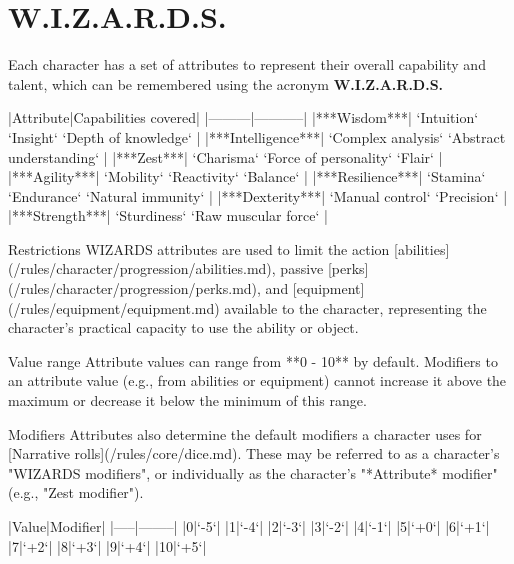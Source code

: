 
\chapter{W.I.Z.A.R.D.S.}

Each character has a set of attributes to represent their overall 
capability and talent,
which can be remembered using the acronym \textbf{W.I.Z.A.R.D.S.}

|Attribute|Capabilities covered|
|---------|-----------|
|***Wisdom***| `Intuition` `Insight` `Depth of knowledge` |
|***Intelligence***| `Complex analysis` `Abstract understanding` |
|***Zest***| `Charisma` `Force of personality` `Flair` |
|***Agility***| `Mobility` `Reactivity` `Balance` |
|***Resilience***| `Stamina` `Endurance` `Natural immunity` |
|***Dexterity***| `Manual control` `Precision` |
|***Strength***| `Sturdiness` `Raw muscular force` |

 Restrictions
WIZARDS attributes are used to limit the action [abilities](/rules/character/progression/abilities.md),
passive [perks](/rules/character/progression/perks.md),
and [equipment](/rules/equipment/equipment.md) available to the character,
representing the character's practical capacity to use the ability or object.

 Value range
Attribute values can range from **0 - 10** by default. 
Modifiers to an attribute value (e.g., from abilities or equipment)
cannot increase it above the maximum or decrease it below the minimum of this range.

 Modifiers
Attributes also determine the default modifiers a character uses for 
[Narrative rolls](/rules/core/dice.md).
These may be referred to as a character's "WIZARDS modifiers", 
or individually as the character's "*Attribute* modifier" (e.g., "Zest modifier").

|Value|Modifier|
|-----|--------|
|0|`-5`|
|1|`-4`|
|2|`-3`|
|3|`-2`|
|4|`-1`|
|5|`+0`|
|6|`+1`|
|7|`+2`|
|8|`+3`|
|9|`+4`|
|10|`+5`|

